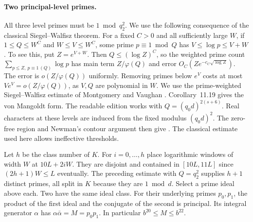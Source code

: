 \paragraph{Two principal-level primes.}
All three level primes must be $1\bmod q_2^2$. We use the following
consequence of the classical Siegel--Walfisz theorem. For a fixed $C>0$
and all sufficiently large $W$, if $1\le Q\le W^C$ and
$W\le V\le W^C$, some prime $p\equiv1\bmod Q$ has
$V\le\log p\le V+W$. To see this, put $Z=e^{V+W}$. Then $Q\le(\log Z)^C$,
so the weighted prime count
$\sum_{p\le Z,\ p\equiv1\,(Q)}\log p$ has main term $Z/\varphi(Q)$
and error $O_C(Z e^{-c_C\sqrt{\log Z}})$. The error is
$o(Z/\varphi(Q))$ uniformly. Removing primes below $e^V$ costs
at most $Ve^V=o(Z/\varphi(Q))$, as $V,Q$ are polynomial in $W$.
We use the prime-weighted Siegel--Walfisz estimate of Montgomery and Vaughan \cite[Corollary~11.21]{MV}. Corollary~11.19 gives the von Mangoldt form. The readable edition works with
$Q=(q_0d)^{2(s+6)}$. Real characters at these levels are induced from the fixed modulus $(q_0d)^2$. The zero-free region and Newman's contour
argument then give .
The classical estimate used here allows ineffective thresholds.

Let $h$ be the class number of $K$. For $i=0,\dots,h$ place logarithmic
windows of width $W$ at $10L+2iW$. They are disjoint and contained in
$[10L,11L]$ since $(2h+1)W\le L$ eventually. The preceding estimate
with $Q=q_2^2$ supplies $h+1$ distinct primes, all split in $K$
because they are $1\bmod d$. Select a prime ideal above each. Two have
the same ideal class. For their underlying primes $p_0,p_1$, the
product of the first ideal and the conjugate of the second is principal.
Its integral generator $\alpha$ has $\alpha\bar\alpha=M=p_0p_1$.
In particular $b^{20}\le M\le b^{22}$.

